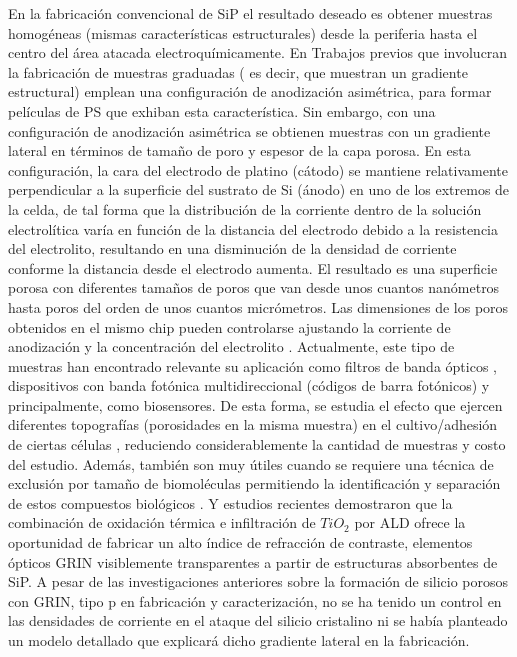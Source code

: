 \documentclass[a4paper,11pt,]{book}
\begin{document}
En la fabricación convencional de SiP el resultado deseado es obtener muestras homogéneas (mismas características estructurales) desde la periferia hasta el centro del área atacada electroquímicamente.  En Trabajos previos que involucran la fabricación de muestras graduadas ( es decir, que muestran un gradiente estructural) emplean una configuración de anodización asimétrica, \cite{I101, I102, I103, I104} para formar películas de PS que exhiban esta característica. Sin embargo, con una configuración de anodización asimétrica se obtienen muestras con un gradiente lateral en términos de tamaño de poro y espesor de la capa porosa.\cite{I101} En esta configuración, la cara del electrodo de platino (cátodo) se mantiene relativamente perpendicular a la superficie del sustrato de Si (ánodo) en uno de los extremos de la celda, de tal forma que la distribución de la corriente dentro de la solución electrolítica varía en función de la distancia del electrodo debido a la resistencia del electrolito, resultando en una disminución de la densidad de corriente conforme la distancia desde el electrodo aumenta.\cite{I102,I103} El resultado es una superficie porosa con diferentes tamaños de poros que van desde unos cuantos nanómetros hasta poros del orden de unos cuantos micrómetros.\cite{I104} Las dimensiones de los poros obtenidos en el mismo chip pueden controlarse ajustando la corriente de anodización y la concentración del electrolito \cite{I11}. Actualmente, este tipo de muestras han encontrado relevante su aplicación como filtros de banda ópticos \cite{I12}, dispositivos con banda fotónica multidireccional (códigos de barra fotónicos) \cite{I13} y principalmente, como biosensores. De esta forma, se estudia el efecto que ejercen diferentes topografías (porosidades en la misma muestra) en el cultivo/adhesión de ciertas células \cite{I14} , reduciendo considerablemente la cantidad de muestras y costo del estudio. Además, también son muy útiles cuando se requiere una técnica de exclusión por tamaño de biomoléculas permitiendo la identificación y separación de estos compuestos biológicos \cite{I15}. Y estudios recientes demostraron que la combinación de oxidación térmica e infiltración de $TiO_2$ por ALD ofrece la oportunidad de fabricar un alto índice de refracción de contraste, elementos ópticos GRIN visiblemente transparentes a partir de estructuras absorbentes de SiP.\cite{I16}  A pesar de las investigaciones anteriores sobre la formación de silicio porosos con GRIN, tipo p en fabricación y caracterización, no se ha tenido un control en  las densidades de corriente en el ataque del silicio cristalino ni se había planteado un modelo detallado que explicará dicho gradiente lateral en la fabricación. 
\end{document}
